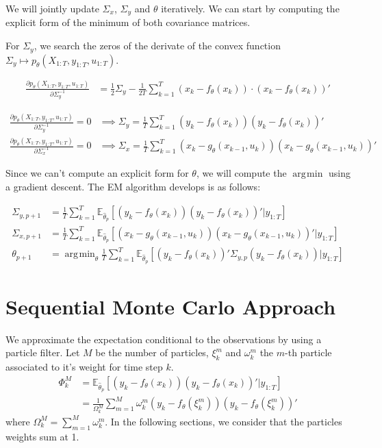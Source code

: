 \documentclass[10pt,a4paper]{report}
\DeclareMathOperator*{\argmin}{\arg\!\min}
\begin{document}
We will jointly update $\Sigma_x$, $\Sigma_y$ and $\theta$ iteratively. We can start by computing the explicit form of the minimum of both covariance matrices.

For $\Sigma_y$, we search the zeros of the derivate of the convex function $\Sigma_y \mapsto p_{\theta}(X_{1:T}, y_{1:T}, u_{1:T})$.

\begin{align*}
    \frac{\partial p_{\theta}(X_{1:T}, y_{1:T}, u_{1:T})}{\partial \Sigma_y^{-1}} & = \frac{1}{2} \Sigma_y - \frac{1}{2T} \sum_{k=1}^T (x_k - f_{\theta}(x_{k})) \cdot (x_k - f_{\theta}(x_{k}))'
\end{align*}

\begin{align*}
    \frac{\partial p_{\theta}(X_{1:T}, y_{1:T}, u_{1:T})}{\partial \Sigma_y^{-1}} = 0 & \implies \Sigma_y = \frac{1}{T}\sum_{k=1}^T (y_k - f_{\theta}(x_k))(y_k - f_{\theta}(x_k))'                   \\
    \frac{\partial p_{\theta}(X_{1:T}, y_{1:T}, u_{1:T})}{\partial \Sigma_x^{-1}} = 0 & \implies \Sigma_x = \frac{1}{T}\sum_{k=1}^T (x_k - g_{\theta}(x_{k-1}, u_k))(x_k - g_{\theta}(x_{k-1}, u_k))'
\end{align*}

Since we can't compute an explicit form for $\theta$, we will compute the $\argmin$ using a gradient descent. The EM algorithm develops is as follows:

\begin{align*}
    \Sigma_{y, p+1} & = \frac{1}{T}\sum_{k=1}^T \mathbb{E}_{\hat \theta_p} \left[ (y_k - f_{\theta}(x_k))(y_k - f_{\theta}(x_k))' | y_{1:T} \right]                                 \\
    \Sigma_{x, p+1} & = \frac{1}{T}\sum_{k=1}^T \mathbb{E}_{\hat \theta_p} \left[ (x_k - g_{\theta}(x_{k-1}, u_k))(x_k - g_{\theta}(x_{k-1}, u_k))' | y_{1:T} \right]               \\
    \theta_{p+1}    & = \argmin_{\theta} \frac{1}{T}\sum_{k=1}^T \mathbb{E}_{\hat \theta_p} \left[ (y_k - f_{\theta}(x_k))' \Sigma_{y, p} (y_k - f_{\theta}(x_k)) | y_{1:T} \right]
\end{align*}

\section{Sequential Monte Carlo Approach}
We approximate the expectation conditional to the observations by using a particle filter. Let $M$ be the number of particles, $\xi_k^m$ and $\omega_k^m$ the $m$-th particle associated to it's weight for time step $k$.
\begin{align*}
    \Phi_k^M & = \mathbb{E}_{\hat \theta_p} \left[ (y_k - f_{\theta}(x_k))(y_k - f_{\theta}(x_k))' | y_{1:T} \right]  \\
             & = \frac{1}{\Omega_k^M} \sum_{m=1}^M \omega_k^m (y_k - f_{\theta}(\xi_k^m))(y_k - f_{\theta}(\xi_k^m))'
\end{align*}
where $\Omega_k^M = \sum_{m=1}^M \omega_k^m$. In the following sections, we consider that the particles weights sum at 1.
\end{document}
